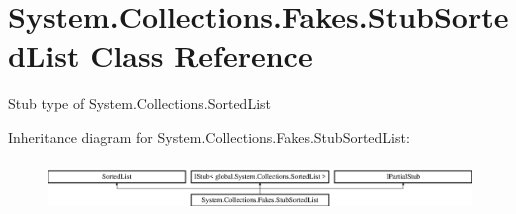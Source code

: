 \hypertarget{class_system_1_1_collections_1_1_fakes_1_1_stub_sorted_list}{\section{System.\-Collections.\-Fakes.\-Stub\-Sorted\-List Class Reference}
\label{class_system_1_1_collections_1_1_fakes_1_1_stub_sorted_list}
}


Stub type of System.\-Collections.\-Sorted\-List 


Inheritance diagram for System.\-Collections.\-Fakes.\-Stub\-Sorted\-List\-:\begin{figure}[H]
\begin{center}
\leavevmode
\includegraphics[height=1.352657cm]{class_system_1_1_collections_1_1_fakes_1_1_stub_sorted_list}
\end{center}
\end{figure}
